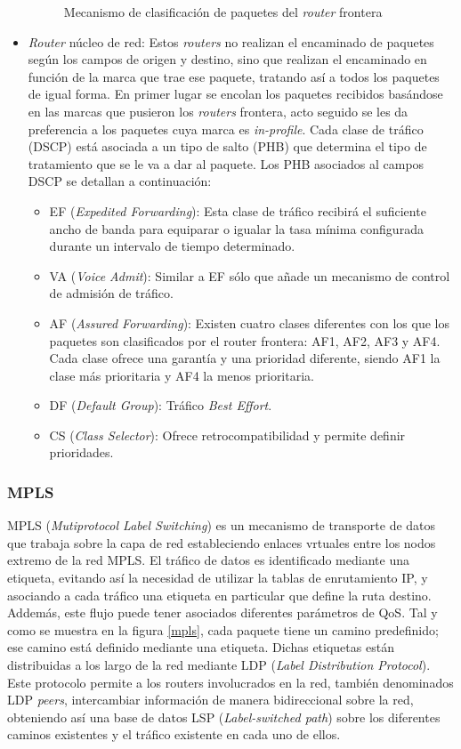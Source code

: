 \begin{itemize}
\begin{figure}[H]
			\caption{Mecanismo de clasificación de paquetes del \textit{router} frontera}
			\label{edgerouter}
		\end{figure}
	\item \textit{Router} núcleo de red: Estos \textit{routers} no realizan el encaminado de paquetes según los campos de origen y destino, sino que realizan el encaminado en función de la marca que trae ese paquete, tratando así a todos los paquetes de igual forma. En primer lugar se encolan los paquetes recibidos basándose en las marcas que pusieron los \textit{routers} frontera, acto seguido se les da preferencia a los paquetes cuya marca es \textit{in-profile}. Cada clase de tráfico (DSCP) está asociada a un tipo de salto (PHB) que determina el tipo de tratamiento que se le va a dar al paquete. Los PHB asociados al campos DSCP se detallan a continuación:
	\begin{itemize}
	    \item EF (\textit{Expedited Forwarding}): Esta clase de tráfico recibirá el suficiente ancho de banda para equiparar o igualar la tasa mínima configurada durante un intervalo de tiempo determinado.
	    \item VA (\textit{Voice Admit}): Similar a EF sólo que añade un mecanismo de control de admisión de tráfico.
	    \item AF (\textit{Assured Forwarding}): Existen cuatro clases diferentes con los que los paquetes son clasificados por el router frontera: AF1, AF2, AF3 y AF4. Cada clase ofrece una garantía y una prioridad diferente, siendo AF1 la clase más prioritaria y AF4 la menos prioritaria.
	    \item DF (\textit{Default Group}): Tráfico \textit{Best Effort}.
	    \item CS (\textit{Class Selector}): Ofrece retrocompatibilidad y permite definir prioridades.
	\end{itemize}
	\end{itemize}
	
	\subsubsection{MPLS}
		 MPLS (\textit{Mutiprotocol Label Switching}) es un mecanismo de transporte de datos que trabaja sobre la capa de red estableciendo enlaces vrtuales entre los nodos extremo de la red MPLS. El tráfico de datos es identificado mediante una etiqueta, evitando así la necesidad de utilizar la tablas de enrutamiento IP, y asociando a cada tráfico una etiqueta en particular que define la ruta destino. Addemás, este flujo puede tener asociados diferentes parámetros de QoS. Tal y como se muestra en la figura \ref{mpls}, cada paquete tiene un camino predefinido; ese camino está definido mediante una etiqueta. Dichas etiquetas están distribuidas a los largo de la red mediante LDP (\textit{Label Distribution Protocol}). Este protocolo permite a los routers involucrados en la red, también denominados LDP \textit{peers}, intercambiar información de manera bidireccional sobre la red,  obteniendo así una base de datos LSP (\textit{Label-switched path}) sobre los diferentes caminos existentes y el tráfico existente en cada uno de ellos.
		 
